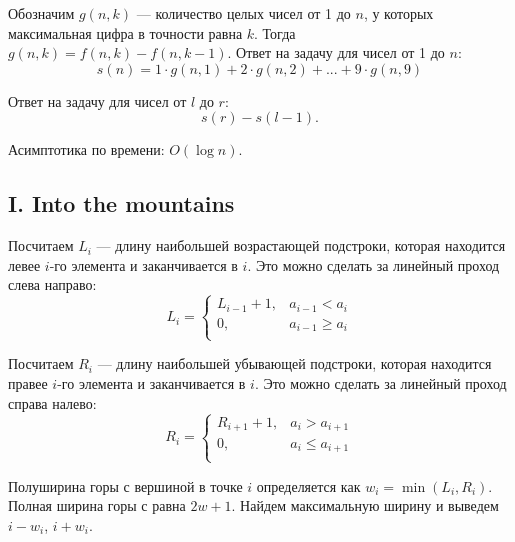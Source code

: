 \documentclass[12pt, a4paper]{article}
\begin{document}
Обозначим $g(n, k)$ --- количество целых чисел от 1 до $n$, у которых максимальная цифра в точности равна $k$. Тогда $g(n, k) = f(n, k) - f(n, k - 1)$. Ответ на задачу для чисел от 1 до $n$:
$$ s(n) = 1 \cdot g(n, 1) + 2 \cdot g(n, 2) + ... + 9 \cdot g(n, 9)$$

Ответ на задачу для чисел от $l$ до $r$:
$$ s(r) - s(l - 1).$$

Асимптотика по времени: $O(\log n)$.



\newpage

\subsection*{I. Into the mountains}

Посчитаем $L_i$ --- длину наибольшей возрастающей подстроки, которая находится левее $i$-го элемента и заканчивается в $i$. Это можно сделать за линейный проход слева направо:
$$
L_i =
\begin{cases}
L_{i-1} + 1, & a_{i-1} < a_i \\
0, & a_{i-1} \geqslant a_i \\
\end{cases}
$$

Посчитаем $R_i$ --- длину наибольшей убывающей подстроки, которая находится правее $i$-го элемента и заканчивается в $i$. Это можно сделать за линейный проход справа налево:
$$
R_i =
\begin{cases}
R_{i+1} + 1, & a_{i} > a_{i + 1} \\
0, & a_{i} \leqslant a_{i + 1} \\
\end{cases}
$$

Полуширина горы с вершиной в точке $i$ определяется как $w_i = \min(L_i, R_i)$. Полная ширина горы с равна $2 w + 1$. Найдем максимальную ширину и выведем $i - w_i$, $i + w_i$.


\end{document}
